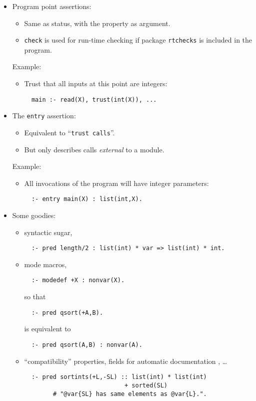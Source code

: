 \documentclass{article}
\renewcommand{\_}{\char'137}
\begin{document}
\begin{itemize}
\item Program point assertions: 
\begin{itemize}
\item Same as status, with the property as argument.
\item {\tt check} is used for run-time checking if package
  \verb+rtchecks+ is included in the program.
\end{itemize}

Example:
\begin{itemize}
\item Trust that all inputs at this point are integers:
\begin{verbatim}
  main :- read(X), trust(int(X)), ...
\end{verbatim}
\end{itemize}

\item The {\tt entry} assertion:
\begin{itemize}
\item Equivalent to ``{\tt trust calls}''.
\item But only describes calls {\em external} to a module.
\end{itemize}

Example:
\begin{itemize}
\item All invocations of the program will have integer parameters:
\begin{verbatim}
  :- entry main(X) : list(int,X).
\end{verbatim}
\end{itemize}

\item Some goodies:
\begin{itemize}
\item syntactic sugar,
\begin{verbatim}
  :- pred length/2 : list(int) * var => list(int) * int.
\end{verbatim}
\item mode macros, 
\begin{verbatim}
  :- modedef +X : nonvar(X).
\end{verbatim}
so that
\begin{verbatim}
  :- pred qsort(+A,B).
\end{verbatim}
is equivalent to
\begin{verbatim}
  :- pred qsort(A,B) : nonvar(A).
\end{verbatim}
\item ``compatibility''  properties, fields for automatic
  documentation \cite{ciaodoc-tr}, \ldots 
\begin{verbatim}
  :- pred sortints(+L,-SL) :: list(int) * list(int) 
                            + sorted(SL)
        # "@var{SL} has same elements as @var{L}.".
\end{verbatim}
\end{itemize}

\end{itemize}
\end{document}
